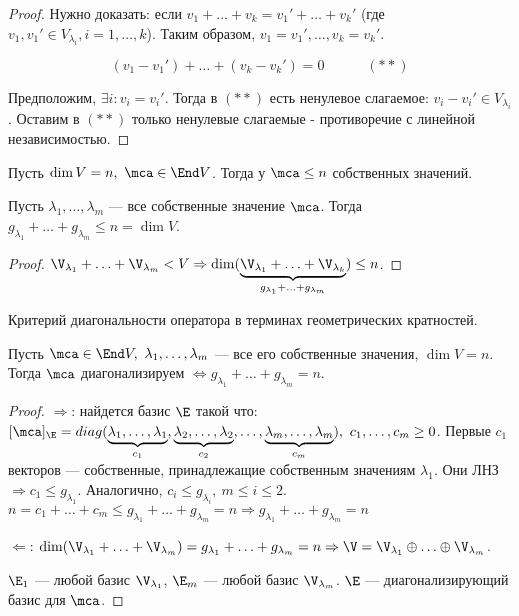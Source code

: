 \documentclass[main]{subfiles}
\begin{document}
\begin{proof}
    Нужно доказать: если $v_1 + \ldots + v_k = v_1' + \ldots + v_k'$
    (где $v_1, v_1' \in V_{\lambda_i}, i = 1, \ldots, k$). 
    Таким образом, $v_1 = v_1', \ldots, v_k = v_k'$. 
    
        \[(v_1 - v_1') + \ldots + (v_k - v_k') = 0 \quad \quad \quad (**)\]
    
    Предположим, $\exists i : v_i = v_i'$. Тогда в $(**)$  есть ненулевое слагаемое:
    $v_i - v_i' \in V_{\lambda_i}$. Оставим в $(**)$ только ненулевые 
    слагаемые  - противоречие с линейной независимостью.
\end{proof}

\begin{corollary}
    Пусть $\dim V = n,\ \mca \in \End V$. Тогда у  $\mca \le n$ собственных значений.
\end{corollary}

\begin{corollary}
    Пусть $\lambda_1, \ldots, \lambda_m$ — все собственные значение $\mca$. 
    Тогда $g_{\lambda_1} + \ldots + g_{\lambda_m} \le n = \dim V$.
\end{corollary}

\begin{proof}
    $\V_{\lambda_1} + \ldots + \V_{\lambda_m} < V 
    \Rightarrow \dim (\underbrace{\V_{\lambda_1} + \ldots + \V_{\lambda_k}}_{g_{\lambda_1} + \ldots + g_{\lambda_m}}) \leq n$.
\end{proof}

\begin{proposition}
    Критерий диагональности оператора в терминах геометрических кратностей.

    Пусть $\mca \in \End V,\ \lambda_1, \ldots, \lambda_m$  — все его собственные значения, 
    $\dim V = n$. Тогда $\mca$  диагонализируем $\Leftrightarrow
    g_{\lambda_1} + \ldots +  g_{\lambda_m} = n$.
\end{proposition}

\begin{proof}
    $\Rightarrow$: найдется базис $\E$ такой что: 
    $[\mca]_\E = diag(\underbrace{\lambda_1, \ldots, \lambda_1}_{c_1},
    \underbrace{\lambda_2, \ldots, \lambda_2}_{c_2}, \ldots,
    \underbrace{\lambda_m, \ldots, \lambda_m}_{c_m}), \  c_1, \ldots, c_m \geq 0$.
    Первые $c_1$  векторов  — собственные, принадлежащие собственным значениям 
    $\lambda_1$. Они ЛНЗ $\Rightarrow c_1 \leq g_{\lambda_1}$.
    Аналогично, $c_i \leq g_{\lambda_i},\ m \leq i \leq 2$.
    $n = c_1 + \ldots + c_m \leq g_{\lambda_1} + \ldots + g_{\lambda_m} = n
    \Rightarrow g_{\lambda_1} + \ldots + g_{\lambda_m} = n$

    $\Leftarrow$: $\dim (\V_{\lambda_1} + \ldots + \V_{\lambda_m}) =
    g_{\lambda_1} + \ldots + g_{\lambda_m} = n \Rightarrow
    \V = \V_{\lambda_1} \oplus \ldots \oplus  \V_{\lambda_m}$.

    $\E_1$  — любой базис $\V_{\lambda_1}$,  
    $\E_m$  — любой базис $\V_{\lambda_m}$. 
    $\E$  — диагонализирующий базис для $\mca$.
\end{proof}
\end{document}
